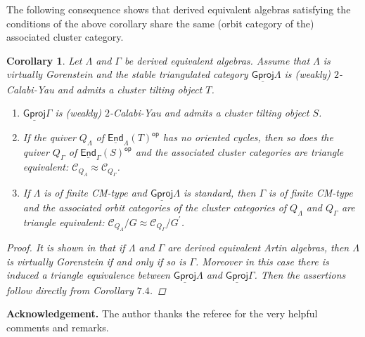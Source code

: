 \documentclass[oneside, a4paper,reqno]{amsart}
\numberwithin{equation}{section}
\newtheorem{cor}[thm]{Corollary}
\theoremstyle{definition}
\begin{document}
The following consequence shows that derived equivalent algebras
satisfying the conditions of the above corollary share the same
(orbit category of the) associated cluster category.

\begin{cor} Let $\Lambda$ and $\Gamma$ be derived equivalent algebras. Assume that $\Lambda$ is virtually Gorenstein
and the stable triangulated category ${\operatorname{\underline{\mathsf{Gproj}}}\nolimits}\Lambda$ is (weakly)
$2$-Calabi-Yau and admits  a cluster tilting object $T$.
\begin{enumerate}
\item ${\operatorname{\underline{\mathsf{Gproj}}}\nolimits}\Gamma$ is (weakly) $2$-Calabi-Yau and admits a cluster tilting object $S$.
\item If the quiver $Q_{\Lambda}$ of $\operatorname*{\underline{\mathsf{End}}}_{\Lambda}(T)^\operatorname*{\mathsf{op}}$ has no oriented cycles,
then so does the quiver $Q_{\Gamma}$ of $\operatorname*{\underline{\mathsf{End}}}_{\Gamma}(S)^\operatorname*{\mathsf{op}}$
and the associated cluster categories are triangle equivalent:
${\mathscr C}_{Q_{\Lambda}} \approx {\mathscr C}_{Q_{\Gamma}}$.
\item If $\Lambda$ is of finite CM-type  and ${\operatorname{\underline{\mathsf{Gproj}}}\nolimits}\Lambda$ is standard, then $\Gamma$ is of finite CM-type and the
associated orbit categories of the cluster categories of
$Q_{\Lambda}$ and $Q_{\Gamma}$  are triangle equivalent:
${\mathscr C}_{Q_{\Lambda}}/G \approx {\mathscr C}_{Q_{\Gamma}}/G^{\prime}$.
\end{enumerate}
\begin{proof} It is shown in \cite{B:cm} that if $\Lambda$ and
$\Gamma$ are derived equivalent Artin algebras, then $\Lambda$ is
virtually Gorenstein if and only if so is $\Gamma$. Moreover in this
case there is induced a triangle equivalence between
${\operatorname{\underline{\mathsf{Gproj}}}\nolimits}\Lambda$ and ${\operatorname{\underline{\mathsf{Gproj}}}\nolimits}\Gamma$. Then the assertions follow
directly from Corollary $7.4$.
\end{proof}
\end{cor}

\medskip

{\bf Acknowledgement.} The author thanks the referee for the very helpful comments and remarks.

\medskip

\medskip
\end{document}
